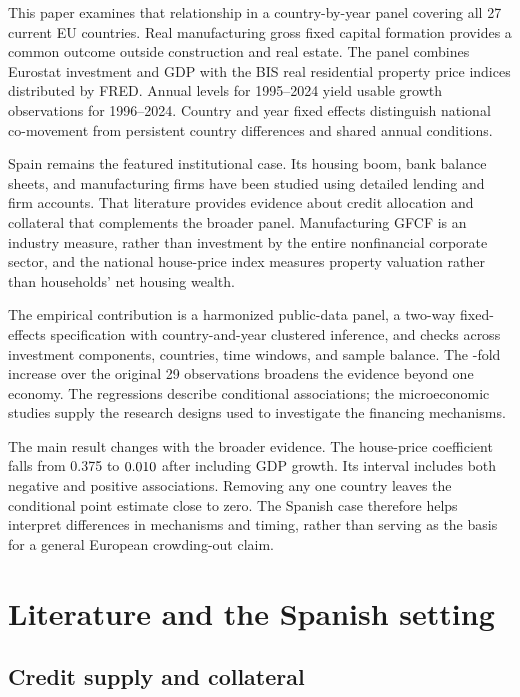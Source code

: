 \documentclass[11pt,letterpaper]{article}
\begin{document}
This paper examines that relationship in a country-by-year panel covering all 27 current EU countries. Real manufacturing gross fixed capital formation provides a common outcome outside construction and real estate. The panel combines Eurostat investment and GDP with the BIS real residential property price indices distributed by FRED. Annual levels for 1995--2024 yield \PanelN{} usable growth observations for 1996--2024. Country and year fixed effects distinguish national co-movement from persistent country differences and shared annual conditions.

Spain remains the featured institutional case. Its housing boom, bank balance sheets, and manufacturing firms have been studied using detailed lending and firm accounts. That literature provides evidence about credit allocation and collateral that complements the broader panel. Manufacturing GFCF is an industry measure, rather than investment by the entire nonfinancial corporate sector, and the national house-price index measures property valuation rather than households' net housing wealth.

The empirical contribution is a harmonized public-data panel, a two-way fixed-effects specification with country-and-year clustered inference, and checks across investment components, countries, time windows, and sample balance. The \PanelMultiple-fold increase over the original 29 observations broadens the evidence beyond one economy. The regressions describe conditional associations; the microeconomic studies supply the research designs used to investigate the financing mechanisms.

The main result changes with the broader evidence. The house-price coefficient falls from 0.375 to $0.010$ after including GDP growth. Its interval includes both negative and positive associations. Removing any one country leaves the conditional point estimate close to zero. The Spanish case therefore helps interpret differences in mechanisms and timing, rather than serving as the basis for a general European crowding-out claim.

\section{Literature and the Spanish setting}

\subsection{Credit supply and collateral}
\end{document}
